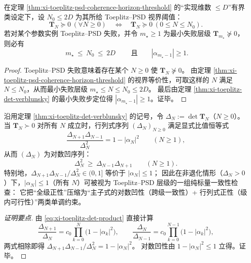 \begin{corollary}[实现维数阈值强制的反射越界层级上界]\label{cor:xi-toeplitz-reflection-overrun-index-bound}
在定理 \ref{thm:xi-toeplitz-psd-coherence-horizon-threshold} 的“实现维数 \(\le D\)”有界类设定下，设 \(N_0\le 2D\) 为其所给 Toeplitz--PSD 视界阈值：
\[
\mathbf{T}_N\succeq 0\ (\forall N\ge 0)
\quad\Longleftrightarrow\quad
\mathbf{T}_N\succeq 0\ (0\le N\le N_0).
\]
若对某个参数实例 Toeplitz--PSD 失败，并令 \(m_\star\ge 1\) 为最小失败层级
\(
\mathbf{T}_{m_\star}\not\succeq 0
\)，
则必有
\[
\boxed{\;
m_\star\ \le\ N_0\ \le\ 2D\;}
\qquad\text{且}\qquad
|\alpha_{m_\star-1}|\ge 1.
\]
\end{corollary}
\begin{proof}
Toeplitz--PSD 失败意味着存在某个 \(N\ge 0\) 使 \(\mathbf{T}_N\not\succeq 0\)。
由定理 \ref{thm:xi-toeplitz-psd-coherence-horizon-threshold} 的视界等价性，可取这样的 \(N\) 满足 \(N\le N_0\)，从而最小失败层级 \(m_\star\le N\le N_0\le 2D\)。
最后由定理 \ref{thm:xi-toeplitz-det-verblunsky} 的最小失败步定位得 \(|\alpha_{m_\star-1}|\ge 1\)。证毕。
\end{proof}

\begin{corollary}\label{cor:xi-toeplitz-principal-minor-logconcavity}
沿用定理 \ref{thm:xi-toeplitz-det-verblunsky} 的记号，令 \(\Delta_N:=\det\mathbf{T}_N\)（\(N\ge 0\)）。
当 \(\mathbf{T}_N\succ 0\) 对所有 \(N\) 成立时，行列式序列 \((\Delta_N)_{N\ge 0}\) 满足显式比值恒等式
\[
\boxed{\;
\frac{\Delta_{N+1}\Delta_{N-1}}{\Delta_N^{2}}=1-|\alpha_N|^2\qquad(N\ge 1),\;}
\]
从而 \((\Delta_N)\) 为对数凹序列：
\[
\boxed{\;
\Delta_N^2\ \ge\ \Delta_{N-1}\Delta_{N+1}\qquad(N\ge 1).\;}
\]
特别地，\(\Delta_{N+1}\Delta_{N-1}/\Delta_N^2\in(0,1]\) 等价于 \(|\alpha_N|\le 1\)；
因此在非退化情形（\(\Delta_N>0\)）下，\(|\alpha_N|\le 1\)（所有 \(N\)）可被视为 Toeplitz--PSD 层级的一组纯标量一致性检查：
它把“全级正性”压缩为“主子式的对数凹性（跨级一致性）+ 行列式正性（级内可行性）”两类单调约束。
\end{corollary}
\begin{proof}[证明要点]
由 \eqref{eq:xi-toeplitz-det-product} 直接计算
\[
\frac{\Delta_{N+1}}{\Delta_N}
=c_0\prod_{k=0}^{N}\bigl(1-|\alpha_k|^2\bigr),
\qquad
\frac{\Delta_{N}}{\Delta_{N-1}}
=c_0\prod_{k=0}^{N-1}\bigl(1-|\alpha_k|^2\bigr),
\]
两式相除即得 \(\Delta_{N+1}\Delta_{N-1}/\Delta_N^2=1-|\alpha_N|^2\)。
对数凹性由 \(1-|\alpha_N|^2\le 1\) 立得。证毕。
\end{proof}

